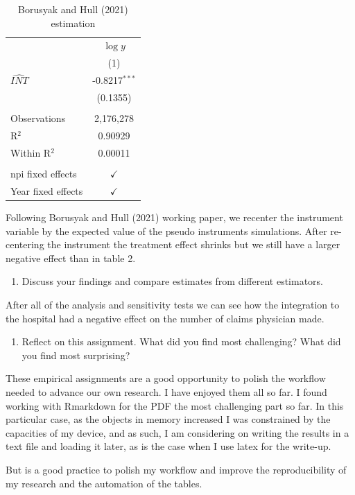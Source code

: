 \documentclass[
  12pt,
]{article}
\providecommand{\tightlist}{%
  \setlength{\itemsep}{0pt}\setlength{\parskip}{0pt}}
\begin{document}
\begin{table}[ht]
\centering
\begin{tabular}{lc}
     \toprule
                        & $\log y$\\   
                        & (1)\\  
     \midrule 
     $\hat{INT}$             & -0.8217$^{***}$\\   
                        & (0.1355)\\   
      \\
     Observations       & 2,176,278\\  
     R$^2$              & 0.90929\\  
     Within R$^2$       & 0.00011\\  
      \\
     npi fixed effects  & $\checkmark$\\   
     Year fixed effects & $\checkmark$\\   
     \bottomrule
  \end{tabular}
\caption{ Borusyak and Hull (2021)  estimation} 
\label{tab:ci}
\end{table}

Following Borusyak and Hull (2021) working paper, we recenter the
instrument variable by the expected value of the pseudo instruments
simulations. After re-centering the instrument the treatment effect
shrinks but we still have a larger negative effect than in table 2.

\begin{enumerate}
\def\labelenumi{\arabic{enumi}.}
\setcounter{enumi}{8}
\tightlist
\item
  Discuss your findings and compare estimates from different estimators.
\end{enumerate}

After all of the analysis and sensitivity tests we can see how the
integration to the hospital had a negative effect on the number of
claims physician made.

\begin{enumerate}
\def\labelenumi{\arabic{enumi}.}
\setcounter{enumi}{9}
\tightlist
\item
  Reflect on this assignment. What did you find most challenging? What
  did you find most surprising?
\end{enumerate}

These empirical assignments are a good opportunity to polish the workflow needed to advance our own research. I have enjoyed them all so far. I
found working with Rmarkdown for the PDF the most challenging part so
far. In this particular case, as the objects in  memory increased I was
constrained by the capacities of my device, and as such, I am considering
on writing the results in a text file and loading it later, as is the case
when I use latex for the write-up. 

But is a good practice to polish my workflow and improve the
reproducibility of my research and the automation of the tables. 
\end{document}
